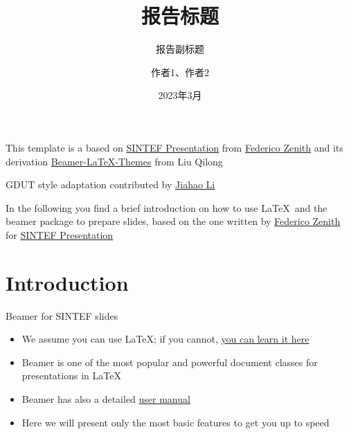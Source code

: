 \documentclass{beamer}
\title{报告标题}
\subtitle{报告副标题}
\author{作者1、作者2}
\date{2023年3月}
\newcommand{\hrefcol}[2]{\textcolor{cyan}{\href{#1}{#2}}}
\begin{document}
\maketitle

\begin{frame}
	
This template is a based on \hrefcol{https://www.overleaf.com/latex/templates/sintef-presentation/jhbhdffczpnx}{SINTEF Presentation} from \hrefcol{mailto:federico.zenith@sintef.no}{Federico Zenith} and its derivation \hrefcol{https://github.com/TOB-KNPOB/Beamer-LaTeX-Themes}{Beamer-LaTeX-Themes} from Liu Qilong

\vspace{\baselineskip}


GDUT style adaptation contributed by \hrefcol{https://jiahaoli57.github.io}{Jiahao Li}

\vspace{\baselineskip}

In the following you find a brief introduction on how to use \LaTeX\ and the beamer package to prepare slides, based on the one written by \hrefcol{mailto:federico.zenith@sintef.no}{Federico Zenith} for \hrefcol{https://www.overleaf.com/latex/templates/sintef-presentation/jhbhdffczpnx}{SINTEF Presentation}


\end{frame}


\section{Introduction}

\begin{frame}{Beamer for SINTEF slides}
	\begin{itemize}
		\item We assume you can use \LaTeX; if you cannot,
		\hrefcol{http://en.wikibooks.org/wiki/LaTeX/}{you can learn it here}
		\item Beamer is one of the most popular and powerful document
		classes for presentations in \LaTeX
		\item Beamer has also a detailed
		\hrefcol{http://www.ctan.org/tex-archive/macros/latex/contrib/beamer/doc/beameruserguide.pdf}{user
			manual}
		\item Here we will present only the most basic features to get you up to speed
	\end{itemize}
\end{frame}
\end{document}
